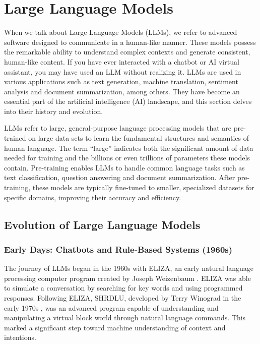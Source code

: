 \section{Large Language Models}

When we talk about Large Language Models (LLMs), we refer to advanced software designed to communicate in a human-like manner. These models possess the remarkable ability to understand complex contexts and generate consistent, human-like content. If you have ever interacted with a chatbot or AI virtual assistant, you may have used an LLM without realizing it. LLMs are used in various applications such as text generation, machine translation, sentiment analysis and document summarization, among others. They have become an essential part of the artificial intelligence (AI) landscape, and this section delves into their history and evolution.

LLMs refer to large, general-purpose language processing models that are pre-trained on large data sets to learn the fundamental structures and semantics of human language. The term “large” indicates both the significant amount of data needed for training and the billions or even trillions of parameters these models contain. Pre-training enables LLMs to handle common language tasks such as text classification, question answering and document summarization. After pre-training, these models are typically fine-tuned to smaller, specialized datasets for specific domains, improving their accuracy and efficiency. \cite{researchgraph2024}

\subsection{Evolution of Large Language Models}

\subsubsection{Early Days: Chatbots and Rule-Based Systems (1960s)}

The journey of LLMs began in the 1960s with ELIZA, an early natural language processing computer program created by Joseph Weizenbaum \cite{weizenbaum1966eliza}. ELIZA was able to simulate a conversation by searching for key words and using programmed responses. Following ELIZA, SHRDLU, developed by Terry Winograd in the early 1970s \cite{winograd1972understanding}, was an advanced program capable of understanding and manipulating a virtual block world through natural language commands. This marked a significant step toward machine understanding of context and intentions.

